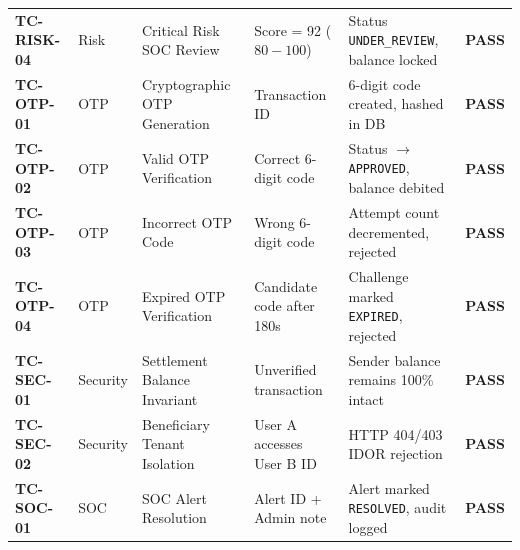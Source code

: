 \begin{longtable}{lp{2.4cm}p{3.2cm}p{3.0cm}p{3.2cm}c}
\addlinespace
\textbf{TC-RISK-04} & Risk & Critical Risk SOC Review & Score = 92 ($80-100$) & Status \texttt{UNDER\_REVIEW}, balance locked & \textbf{PASS} \\
\addlinespace
\textbf{TC-OTP-01} & OTP & Cryptographic OTP Generation & Transaction ID & 6-digit code created, hashed in DB & \textbf{PASS} \\
\addlinespace
\textbf{TC-OTP-02} & OTP & Valid OTP Verification & Correct 6-digit code & Status $\to$ \texttt{APPROVED}, balance debited & \textbf{PASS} \\
\addlinespace
\textbf{TC-OTP-03} & OTP & Incorrect OTP Code & Wrong 6-digit code & Attempt count decremented, rejected & \textbf{PASS} \\
\addlinespace
\textbf{TC-OTP-04} & OTP & Expired OTP Verification & Candidate code after 180s & Challenge marked \texttt{EXPIRED}, rejected & \textbf{PASS} \\
\addlinespace
\textbf{TC-SEC-01} & Security & Settlement Balance Invariant & Unverified transaction & Sender balance remains 100\% intact & \textbf{PASS} \\
\addlinespace
\textbf{TC-SEC-02} & Security & Beneficiary Tenant Isolation & User A accesses User B ID & HTTP 404/403 IDOR rejection & \textbf{PASS} \\
\addlinespace
\textbf{TC-SOC-01} & SOC & SOC Alert Resolution & Alert ID + Admin note & Alert marked \texttt{RESOLVED}, audit logged & \textbf{PASS} \\

\end{longtable}
